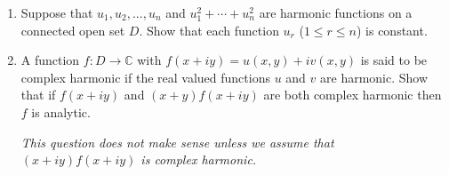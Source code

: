 \documentclass[12pt]{Homework}
\begin{document}
\begin{problem} $\,$
\begin{enumerate}[label=(\alph*)]
    \item Suppose that $u_1,u_2,...,u_n$ and $u_1^2+\cdots+u_n^2$ are harmonic functions on a connected open set $D$. Show that each function $u_r$ ($1\le r\le n$) is constant.
    \item A function $f:D\to\mathbb{C}$ with $f(x+iy)=u(x,y)+iv(x,y)$ is said to be complex harmonic if the real valued functions $u$ and $v$ are harmonic. Show that if $f(x+iy)$ and $(x+y)f(x+iy)$ are both complex harmonic then $f$ is analytic. 
    
    \textit{ This question does not make sense unless we assume that $(x+iy)f(x+iy)$ is complex harmonic.}
\end{enumerate}
\end{problem}
\end{document}
